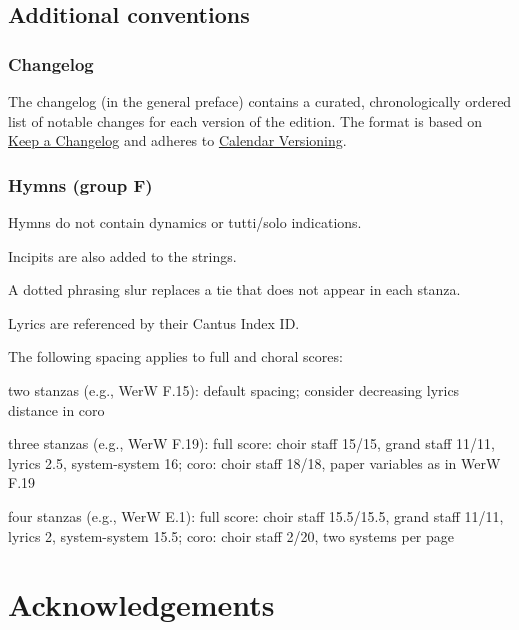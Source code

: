 \documentclass{ees}
\begin{document}
\subsection{Additional conventions}

\subsubsection{Changelog}

The changelog (in the general preface) contains a curated, chronologically ordered list of notable changes for each version of the edition. The format is based on \href{https://keepachangelog.com/en/1.0.0/}{Keep a Changelog} and adheres to \href{https://calver.org}{Calendar Versioning}.

\subsubsection{Hymns (group F)}

Hymns do not contain dynamics or tutti/solo indications.

Incipits are also added to the strings.

A dotted phrasing slur replaces a tie that does not appear in each stanza.

Lyrics are referenced by their Cantus Index ID.

The following spacing applies to full and choral scores:
\begin{bulletlist}
  \item two stanzas (e.g., WerW F.15):
    default spacing;
    consider decreasing lyrics distance in coro
  \item three stanzas (e.g., WerW F.19):
    full score:
      choir staff 15/15,
      grand staff 11/11,
      lyrics 2.5,
      system-system 16;
    coro:
      choir staff 18/18,
      paper variables as in WerW F.19
  \item four stanzas (e.g., WerW E.1):
    full score:
      choir staff 15.5/15.5,
      grand staff 11/11,
      lyrics 2,
      system-system 15.5;
    coro:
      choir staff 2/20,
      two systems per page
\end{bulletlist}



\section{Acknowledgements}
\end{document}
